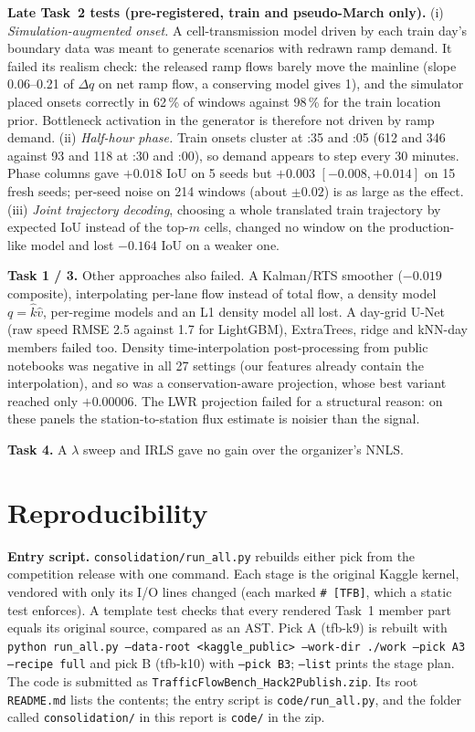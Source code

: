 \documentclass[conference,10pt]{IEEEtran}
\newcommand{\file}[1]{\texttt{\small #1}}
\begin{document}
\textbf{Late Task~2 tests (pre-registered, train and pseudo-March only).} (i) \emph{Simulation-augmented onset.} A cell-transmission
model driven by each train day's boundary data was meant to generate scenarios with redrawn ramp demand. It failed its realism check: the
released ramp flows barely move the mainline (slope 0.06--0.21 of $\Delta q$ on net ramp flow, a conserving model gives 1), and the
simulator placed onsets correctly in 62\,\% of windows against 98\,\% for the train location prior. Bottleneck activation in the
generator is therefore not driven by ramp demand. (ii) \emph{Half-hour phase.} Train onsets cluster at :35 and :05 (612 and 346 against
93 and 118 at :30 and :00), so demand appears to step every 30 minutes. Phase columns gave $+0.018$ IoU on 5 seeds but $+0.003$
$[-0.008, +0.014]$ on 15 fresh seeds; per-seed noise on 214 windows (about $\pm0.02$) is as large as the effect. (iii) \emph{Joint
trajectory decoding}, choosing a whole translated train trajectory by expected IoU instead of the top-$m$ cells, changed no window on
the production-like model and lost $-0.164$ IoU on a weaker one.

\textbf{Task 1 / 3.} Other approaches also failed. A Kalman/RTS smoother ($-0.019$ composite), interpolating per-lane flow instead of total
flow, a density model $q=\hat k\hat v$, per-regime models and an L1 density model all lost. A day-grid U-Net (raw speed RMSE 2.5 against 1.7 for
LightGBM), ExtraTrees, ridge and kNN-day members failed too. Density time-interpolation post-processing from public notebooks was negative in
all 27 settings (our features already contain the interpolation), and so was a conservation-aware projection, whose best variant reached only
$+0.00006$. The LWR projection failed for a structural reason: on these panels the
station-to-station flux estimate is noisier than the signal.

\textbf{Task 4.} A $\lambda$ sweep and IRLS gave no gain over the organizer's NNLS.

\section{Reproducibility}\label{sec:repro}
\textbf{Entry script.} \file{consolidation/run\_all.py} rebuilds either pick from the competition release with one command. Each
stage is the original Kaggle kernel, vendored with only its I/O lines changed (each marked \texttt{\# [TFB]}, which a static test
enforces). A template test checks that every rendered Task~1 member part equals its original source, compared as an AST.
Pick A (tfb-k9) is rebuilt with \texttt{python run\_all.py --data-root <kaggle\_public> --work-dir ./work --pick A3 --recipe full}
and pick B (tfb-k10) with \texttt{--pick B3}; \texttt{--list} prints the stage plan.
The code is submitted as \file{TrafficFlowBench\_Hack2Publish.zip}. Its root \file{README.md} lists the contents; the entry script is \file{code/run\_all.py}, and the folder called \file{consolidation/} in this report is \file{code/} in the zip.
\end{document}
